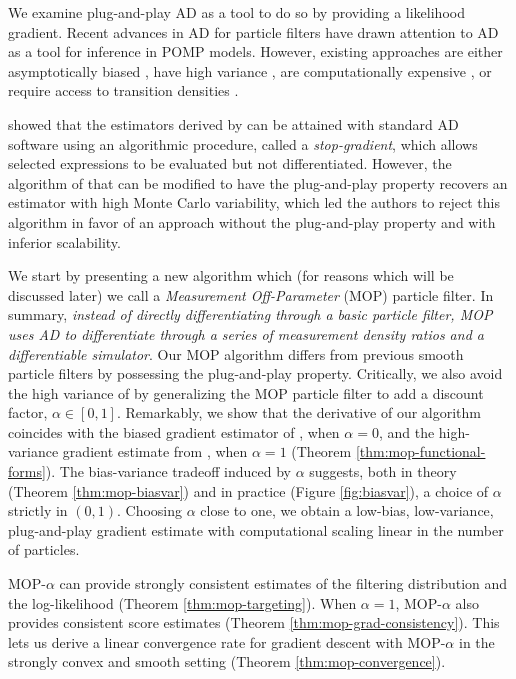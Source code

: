 \documentclass[numsec,webpdf,modern,medium,namedate]{oup-authoring-template}
\theoremstyle{thmstyleone}%
\theoremstyle{thmstyletwo}%
\theoremstyle{thmstylethree}%
\begin{document}
We examine plug-and-play AD as a tool to do so by providing a likelihood gradient. Recent advances in AD for particle filters \citep{naesseth18, jonschkowski18, corenflos21, scibior21, singh22} have drawn attention to AD as a tool for inference in POMP models.
However, existing approaches are either asymptotically biased \citep{naesseth18, jonschkowski18}, have high variance \citep{poyiadjis11, scibior21}, are computationally expensive \citep{corenflos21, chen24}, or require access to transition densities \citep{poyiadjis11, scibior21, singh22, chen24}. 

\cite{scibior21} showed that the estimators derived by \cite{poyiadjis11} can be attained with standard AD software using an algorithmic procedure, called a {\it stop-gradient}, which allows selected expressions to be evaluated but not differentiated.
However, the algorithm of \cite{scibior21} that can be modified to have the plug-and-play property recovers an estimator with high Monte Carlo variability, which led the authors to reject this algorithm in favor of an approach without the plug-and-play property and with inferior scalability.

We start by presenting a new algorithm which (for reasons which will be discussed later) we call a {\it Measurement Off-Parameter} (MOP) particle filter. 
In summary, \textit{instead of directly differentiating through a basic particle filter, MOP uses AD to differentiate through a series of measurement density ratios and a differentiable simulator}. 
Our MOP algorithm differs from previous smooth particle filters \citep{svensson18,malik11} by possessing the plug-and-play property.
Critically, we also avoid the high variance of \cite{svensson18} by generalizing the MOP particle filter to add a discount factor, $\alpha \in [0,1]$.
Remarkably, we show that the derivative of our algorithm coincides with the biased gradient estimator of \cite{naesseth18}, when $\alpha=0$, and the high-variance gradient estimate from \citep{poyiadjis11, scibior21}, when $\alpha=1$ (Theorem \ref{thm:mop-functional-forms}).
The bias-variance tradeoff induced by $\alpha$ suggests, both in theory (Theorem \ref{thm:mop-biasvar}) and in practice (Figure \ref{fig:biasvar}), a choice of $\alpha$ strictly in $(0,1)$.
Choosing $\alpha$ close to one, we obtain a low-bias, low-variance, plug-and-play gradient estimate with computational scaling linear in the number of particles.

MOP-$\alpha$ can provide strongly consistent estimates of the filtering distribution and the log-likelihood (Theorem \ref{thm:mop-targeting}).
When $\alpha=1$, MOP-$\alpha$ also provides consistent score estimates (Theorem \ref{thm:mop-grad-consistency}). This lets us derive a linear convergence rate for gradient descent with MOP-$\alpha$ in the strongly convex and smooth setting (Theorem \ref{thm:mop-convergence}).
\end{document}
